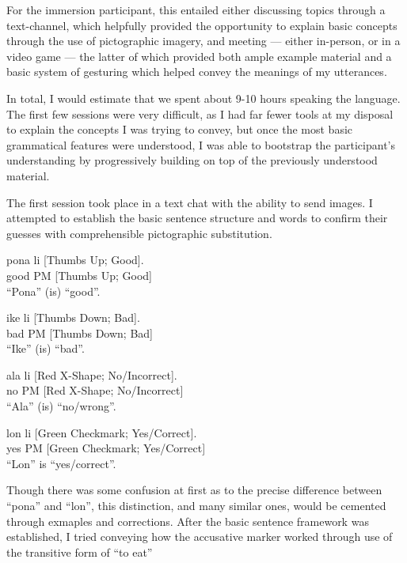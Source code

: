 \documentclass[a4paper,10pt]{article}
\begin{document}
For the immersion participant, this entailed either discussing topics through a text-channel, which
helpfully provided the opportunity to explain basic concepts through the use of pictographic imagery,
and meeting --- either in-person, or in a video game --- the latter of which provided both ample
example material and a basic system of gesturing which helped convey the meanings of my utterances.

In total, I would estimate that we spent about 9-10 hours speaking the language. The first few sessions
were very difficult, as I had far fewer tools at my disposal to explain the concepts I was trying to
convey, but once the most basic grammatical features were understood, I was able to bootstrap the
participant's understanding by progressively building on top of the previously understood material.

The first session took place in a text chat with the ability to send images. I attempted to establish
the basic sentence structure and words to confirm their guesses with comprehensible pictographic
substitution.

\begin{exe}
 \ex
 \gll pona li [Thumbs Up; Good]. \\
 good PM [Thumbs Up; Good] \\
 \glt ``Pona'' (is) ``good''.
\end{exe}
\begin{exe}
 \ex
 \gll ike li [Thumbs Down; Bad]. \\
 bad PM [Thumbs Down; Bad] \\
 \glt ``Ike'' (is) ``bad''.
\end{exe}
\begin{exe}
 \ex
 \gll ala li [Red X-Shape; No/Incorrect]. \\
 no PM [Red X-Shape; No/Incorrect] \\
 \glt ``Ala'' (is) ``no/wrong''.
\end{exe}
\begin{exe}
 \ex
 \gll lon li [Green Checkmark; Yes/Correct]. \\
 yes PM [Green Checkmark; Yes/Correct] \\
 \glt ``Lon'' is ``yes/correct''.
\end{exe}

Though there was some confusion at first as to the precise difference between ``pona'' and ``lon'',
this distinction, and many similar ones, would be cemented through exmaples and corrections. After
the basic sentence framework was established, I tried conveying how the accusative marker worked
through use of the transitive form of ``to eat''
\end{document}
